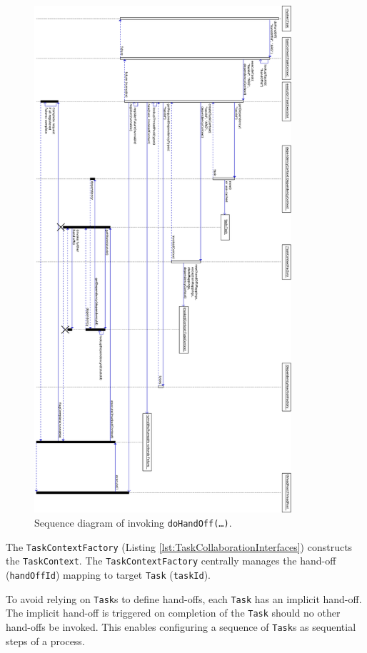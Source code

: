 \documentclass[prodmode]{style/acmlarge}
\begin{document}
\begin{figure}[!t]
\centering
\includegraphics[height=7.4in]{DoContinuationSequenceDiagram}
\caption{Sequence diagram of invoking \texttt{doHandOff(\ldots)}.}
\label{fig:DoContinuationSequenceDiagram}
\end{figure}

The \texttt{TaskContextFactory} (Listing \ref{lst:TaskCollaborationInterfaces})
constructs the \texttt{TaskContext}.  The \texttt{TaskContextFactory} centrally
manages the hand-off (\texttt{handOffId}) mapping to target \texttt{Task}
(\texttt{taskId}).

To avoid relying on \texttt{Task}s to define hand-offs, each \texttt{Task} has
an implicit hand-off.  The implicit hand-off is triggered on completion of the
\texttt{Task} should no other hand-offs be invoked.  This enables configuring a
sequence of \texttt{Task}s as sequential steps of a process.
\end{document}
